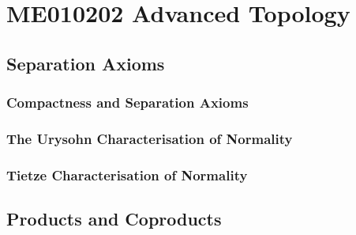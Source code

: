 

\part{ME010202 Advanced Topology}


\setcounter{chapter}{6}
\chapter{Separation Axioms}
\section{Compactness and Separation Axioms}
\section{The Urysohn Characterisation of Normality}
\section{Tietze Characterisation of Normality}

\chapter{Products and Coproducts}
